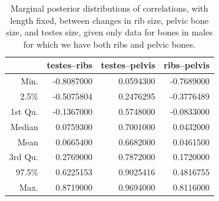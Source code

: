 \documentclass[12pt]{article}
\begin{document}


\begin{table}[ht]
\centering
\begin{tabular}{rrrr}
  \hline
        &  testes--ribs & testes--pelvis & ribs--pelvis \\
  \hline
 Min. &     -0.8087000  &   0.0594300 & -0.7689000   \\
 2.5\% &    -0.5075804  &   0.2476295 & -0.3776489   \\
 1st Qu. &  -0.1367000  &   0.5748000 & -0.0833000   \\
 Median &    0.0759300  &   0.7001000 &  0.0432000   \\
 Mean &      0.0665400  &   0.6682000 &  0.0461500   \\
 3rd Qu. &   0.2769000  &   0.7872000 &  0.1720000   \\
 97.5\%  &   0.6225153  &   0.9025416 &  0.4816755   \\
 Max. &      0.8719000  &   0.9694000 &  0.8116000   \\
   \hline
\end{tabular}
  \caption{Marginal posterior distributions of correlations, with length fixed,
  between changes in rib size, pelvic bone size, and testes size,
  given only data for bones in males for which we have both ribs and pelvic bones.
  \label{tab:complete_males_posterior_cors}
}
\end{table}
\end{document}
